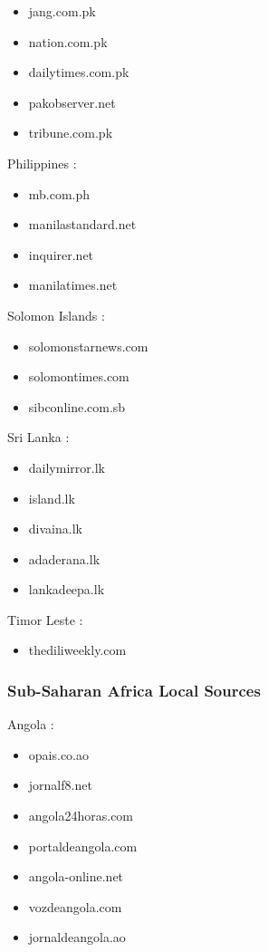 \documentclass[
  letterpaper,
  DIV=11,
  numbers=noendperiod]{scrartcl}
\providecommand{\tightlist}{%
  \setlength{\itemsep}{0pt}\setlength{\parskip}{0pt}}\usepackage{longtable,booktabs,array}
\begin{document}
\begin{itemize}
\tightlist
\item
  jang.com.pk
\item
  nation.com.pk
\item
  dailytimes.com.pk
\item
  pakobserver.net
\item
  tribune.com.pk
\end{itemize}

Philippines :

\begin{itemize}
\tightlist
\item
  mb.com.ph
\item
  manilastandard.net
\item
  inquirer.net
\item
  manilatimes.net
\end{itemize}

Solomon Islands :

\begin{itemize}
\tightlist
\item
  solomonstarnews.com
\item
  solomontimes.com
\item
  sibconline.com.sb
\end{itemize}

Sri Lanka :

\begin{itemize}
\tightlist
\item
  dailymirror.lk
\item
  island.lk
\item
  divaina.lk
\item
  adaderana.lk
\item
  lankadeepa.lk
\end{itemize}

Timor Leste :

\begin{itemize}
\tightlist
\item
  thediliweekly.com
\end{itemize}

\subsubsection{Sub-Saharan Africa Local
Sources}\label{sub-saharan-africa-local-sources}

Angola :

\begin{itemize}
\tightlist
\item
  opais.co.ao
\item
  jornalf8.net
\item
  angola24horas.com
\item
  portaldeangola.com
\item
  angola-online.net
\item
  vozdeangola.com
\item
  jornaldeangola.ao
\end{itemize}
\end{document}
